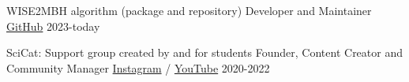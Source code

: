 
\begin{cventries}
  \cventry
    {WISE2MBH algorithm (package and repository)}
    {Developer and Maintainer}
    {\href{https://github.com/joacoh/wise2mbh}{GitHub}}
    {2023-today}
    {}

  \cventry
    {SciCat: Support group created by and for students}
    {Founder, Content Creator and Community Manager}
    {\href{https://www.instagram.com/scicat.cl/}{Instagram} /
     \href{https://www.youtube.com/channel/UC4y3QUrci4jNY9kQ2tiS67A}{YouTube}}
    {2020-2022}
    {}
    
\end{cventries}
